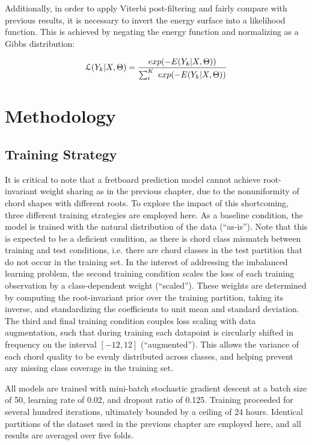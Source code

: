 Additionally, in order to apply Viterbi post-filtering and fairly compare with previous results, it is necessary to invert the energy surface into a likelihood function.
This is achieved by negating the energy function and normalizing as a Gibbs distribution:

\begin{equation}
\small
\mathcal{L}(Y_k \vert X, \Theta) = \frac{exp(-E(Y_k \vert X, \Theta))}{\sum_i^K~exp(-E(Y_k \vert X, \Theta))}
\end{equation}


\section{Methodology}

\subsection{Training Strategy}
\label{subsec:strategy}

It is critical to note that a fretboard prediction model cannot achieve root-invariant weight sharing as in the previous chapter, due to the nonuniformity of chord shapes with different roots.
To explore the impact of this shortcoming, three different training strategies are employed here.
As a baseline condition, the model is trained with the natural distribution of the data (``as-is'').
Note that this is expected to be a deficient condition, as there is chord class mismatch between training and test conditions, i.e. there are chord classes in the test partition that do not occur in the training set.
In the interest of addressing the imbalanced learning problem, the second training condition scales the loss of each training observation by a class-dependent weight (``scaled'').
These weights are determined by computing the root-invariant prior over the training partition, taking its inverse, and standardizing the coefficients to unit mean and standard deviation.
The third and final training condition couples loss scaling with data augmentation, such that during training each datapoint is circularly shifted in frequency on the interval $[-12, 12]$ (``augmented'').
This allows the variance of each chord quality to be evenly distributed across classes, and helping prevent any missing class coverage in the training set.

All models are trained with mini-batch stochastic gradient descent at a batch size of 50, learning rate of 0.02, and dropout ratio of 0.125.
Training proceeded for several hundred iterations, ultimately bounded by a ceiling of 24 hours.
Identical partitions of the dataset used in the previous chapter are employed here, and all results are averaged over five folds.


